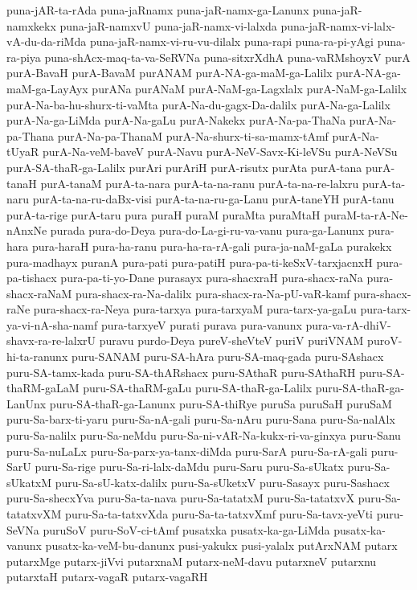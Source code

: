 {puna-jAR-ta-rAda
puna-jaRnamx
puna-jaR-namx-ga-Lanunx
puna-jaR-namxkekx
puna-jaR-namxvU
puna-jaR-namx-vi-lalxda
puna-jaR-namx-vi-lalx-vA-du-da-riMda
puna-jaR-namx-vi-ru-vu-dilalx
puna-rapi
puna-ra-pi-yAgi
puna-ra-piya
puna-shAcx-maq-ta-va-SeRVNa
puna-sitxrXdhA
puna-vaRMshoyxV
purA
purA-BavaH
purA-BavaM
purANAM
purA-NA-ga-maM-ga-Lalilx
purA-NA-ga-maM-ga-LayAyx
purANa
purANaM
purA-NaM-ga-Lagxlalx
purA-NaM-ga-Lalilx
purA-Na-ba-hu-shurx-ti-vaMta
purA-Na-du-gagx-Da-dalilx
purA-Na-ga-Lalilx
purA-Na-ga-LiMda
purA-Na-gaLu
purA-Nakekx
purA-Na-pa-ThaNa
purA-Na-pa-Thana
purA-Na-pa-ThanaM
purA-Na-shurx-ti-sa-mamx-tAmf
purA-Na-tUyaR
purA-Na-veM-baveV
purA-Navu
purA-NeV-Savx-Ki-leVSu
purA-NeVSu
purA-SA-thaR-ga-Lalilx
purAri
purAriH
purA-risutx
purAta
purA-tana
purA-tanaH
purA-tanaM
purA-ta-nara
purA-ta-na-ranu
purA-ta-na-re-lalxru
purA-ta-naru
purA-ta-na-ru-daBx-visi
purA-ta-na-ru-ga-Lanu
purA-taneYH
purA-tanu
purA-ta-rige
purA-taru
pura
puraH
puraM
puraMta
puraMtaH
puraM-ta-rA-Ne-nAnxNe
purada
pura-do-Deya
pura-do-La-gi-ru-va-vanu
pura-ga-Lanunx
pura-hara
pura-haraH
pura-ha-ranu
pura-ha-ra-rA-gali
pura-ja-naM-gaLa
purakekx
pura-madhayx
puranA
pura-pati
pura-patiH
pura-pa-ti-keSxV-tarxjacnxH
pura-pa-tishacx
pura-pa-ti-yo-Dane
purasayx
pura-shacxraH
pura-shacx-raNa
pura-shacx-raNaM
pura-shacx-ra-Na-dalilx
pura-shacx-ra-Na-pU-vaR-kamf
pura-shacx-raNe
pura-shacx-ra-Neya
pura-tarxya
pura-tarxyaM
pura-tarx-ya-gaLu
pura-tarx-ya-vi-nA-sha-namf
pura-tarxyeV
purati
purava
pura-vanunx
pura-va-rA-dhiV-shavx-ra-re-lalxrU
puravu
purdo-Deya
pureV-sheVteV
puriV
puriVNAM
puroV-hi-ta-ranunx
puru-SANAM
puru-SA-hAra
puru-SA-maq-gada
puru-SAshacx
puru-SA-tamx-kada
puru-SA-thARshacx
puru-SAthaR
puru-SAthaRH
puru-SA-thaRM-gaLaM
puru-SA-thaRM-gaLu
puru-SA-thaR-ga-Lalilx
puru-SA-thaR-ga-LanUnx
puru-SA-thaR-ga-Lanunx
puru-SA-thiRye
puruSa
puruSaH
puruSaM
puru-Sa-barx-ti-yaru
puru-Sa-nA-gali
puru-Sa-nAru
puru-Sana
puru-Sa-nalAlx
puru-Sa-nalilx
puru-Sa-neMdu
puru-Sa-ni-vAR-Na-kukx-ri-va-ginxya
puru-Sanu
puru-Sa-nuLaLx
puru-Sa-parx-ya-tanx-diMda
puru-SarA
puru-Sa-rA-gali
puru-SarU
puru-Sa-rige
puru-Sa-ri-lalx-daMdu
puru-Saru
puru-Sa-sUkatx
puru-Sa-sUkatxM
puru-Sa-sU-katx-dalilx
puru-Sa-sUketxV
puru-Sasayx
puru-Sashacx
puru-Sa-shecxYva
puru-Sa-ta-nava
puru-Sa-tatatxM
puru-Sa-tatatxvX
puru-Sa-tatatxvXM
puru-Sa-ta-tatxvXda
puru-Sa-ta-tatxvXmf
puru-Sa-tavx-yeVti
puru-SeVNa
puruSoV
puru-SoV-ci-tAmf
pusatxka
pusatx-ka-ga-LiMda
pusatx-ka-vanunx
pusatx-ka-veM-bu-danunx
pusi-yakukx
pusi-yalalx
putArxNAM
putarx
putarxMge
putarx-jiVvi
putarxnaM
putarx-neM-davu
putarxneV
putarxnu
putarxtaH
putarx-vagaR
putarx-vagaRH
}
